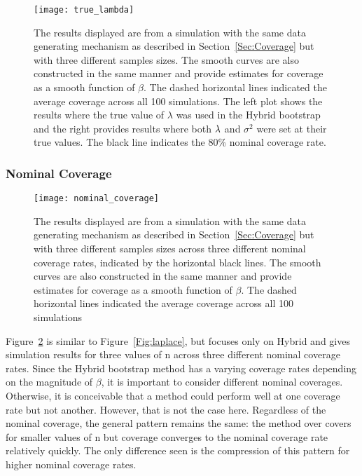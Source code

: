 
\begin{figure}[hbtp]
  \texttt{[image: true\_lambda]}
  \caption{\label{Fig:true_lambda} The results displayed are from a simulation with the same data generating mechanism as described in Section~\ref{Sec:Coverage} but with three different samples sizes. The smooth curves are also constructed in the same manner and provide estimates for coverage as a smooth function of $\beta$. The dashed horizontal lines indicated the average coverage across all 100 simulations. The left plot shows the results where the true value of $\lambda$ was used in the Hybrid bootstrap and the right provides results where both $\lambda$ and $\sigma^2$ were set at their true values. The black line indicates the 80\% nominal coverage rate.}
\end{figure}

\subsubsection{Nominal Coverage}

\begin{figure}[hbtp]
  \texttt{[image: nominal\_coverage]}
  \caption{\label{Fig:nominal_coverage}  The results displayed are from a simulation with the same data generating mechanism as described in Section~\ref{Sec:Coverage} but with three different samples sizes across three different nominal coverage rates, indicated by the horizontal black lines. The smooth curves are also constructed in the same manner and provide estimates for coverage as a smooth function of $\beta$. The dashed horizontal lines indicated the average coverage across all 100 simulations}
\end{figure} 

Figure~\ref{Fig:nominal_coverage} is similar to Figure~\ref{Fig:laplace}, but focuses only on Hybrid and gives simulation results for three values of n across three different nominal coverage rates. Since the Hybrid bootstrap method has a varying coverage rates depending on the magnitude of $\beta$, it is important to consider different nominal coverages. Otherwise, it is conceivable that a method could perform well at one coverage rate but not another. However, that is not the case here. Regardless of the nominal coverage, the general pattern remains the same: the method over covers for smaller values of n but coverage converges to the nominal coverage rate relatively quickly. The only difference seen is the compression of this pattern for higher nominal coverage rates.
